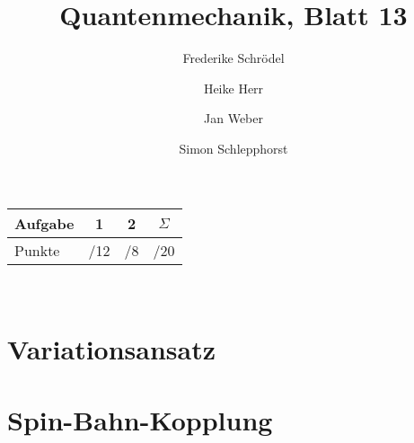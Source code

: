 \documentclass[11pt, ngerman, fleqn, DIV=15, headinclude]{scrartcl}
\title{Quantenmechanik, Blatt 13}
\author{
    Frederike Schrödel \and Heike Herr \and Jan Weber \and Simon Schlepphorst
}
\begin{document}
\maketitle
\begin{center}
	\begin{tabular}{l|c|c|c}
		Aufgabe &1&2&$\Sigma$\\
		\hline
		Punkte &\quad /12 & \quad /8 & \quad /20
	\end{tabular}\\
\end{center}

\section{Variationsansatz}

\section{Spin-Bahn-Kopplung}
\end{document}
